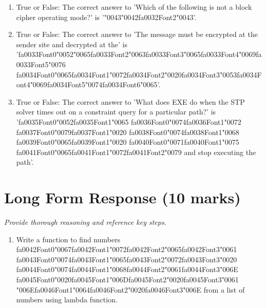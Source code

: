 \documentclass[12pt]{article}
\begin{document}
\begin{enumerate}[label=\arabic*.]
\item True or False: The correct answer to 'Which of the following is not a block cipher operating mode?' is '{\char"0043}{\char"0042}{\csname fa0032Font2\endcsname\char"0043}'.
\item True or False: The correct answer to 'The message must be encrypted at the sender site and decrypted at the' is '{\csname fa0033Font0\endcsname\char"0052}{\char"0065}{\csname fa0033Font2\endcsname\char"0063}{\csname fa0033Font3\endcsname\char"0065}{\csname fa0033Font4\endcsname\char"0069}{\csname fa0033Font5\endcsname\char"0076} {\csname fa0034Font0\endcsname\char"0065}{\csname fa0034Font1\endcsname\char"0072}{\csname fa0034Font2\endcsname\char"0020}{\csname fa0034Font3\endcsname\char"0053}{\csname fa0034Font4\endcsname\char"0069}{\csname fa0034Font5\endcsname\char"0074}{\csname fa0034Font6\endcsname\char"0065}'.
\item True or False: The correct answer to 'What does EXE do when the STP solver times out on a constraint query for a particular path?' is '{\csname fa0035Font0\endcsname\char"0052}{\csname fa0035Font1\endcsname\char"0065} {\csname fa0036Font0\endcsname\char"0074}{\csname fa0036Font1\endcsname\char"0072} {\csname fa0037Font0\endcsname\char"0079}{\csname fa0037Font1\endcsname\char"0020} {\csname fa0038Font0\endcsname\char"0074}{\csname fa0038Font1\endcsname\char"0068} {\csname fa0039Font0\endcsname\char"0065}{\csname fa0039Font1\endcsname\char"0020} {\csname fa0040Font0\endcsname\char"0071}{\csname fa0040Font1\endcsname\char"0075} {\csname fa0041Font0\endcsname\char"0065}{\csname fa0041Font1\endcsname\char"0072}{\csname fa0041Font2\endcsname\char"0079} and stop executing the path'.
\end{enumerate}

\section*{Long Form Response (10 marks)}
\textit{Provide thorough reasoning and reference key steps.}
\begin{enumerate}[label=\arabic*.]
\item Write a function to find numbers {\csname fa0042Font0\endcsname\char"0067}{\csname fa0042Font1\endcsname\char"0072}{\csname fa0042Font2\endcsname\char"0065}{\csname fa0042Font3\endcsname\char"0061} {\csname fa0043Font0\endcsname\char"0074}{\csname fa0043Font1\endcsname\char"0065}{\csname fa0043Font2\endcsname\char"0072}{\csname fa0043Font3\endcsname\char"0020} {\csname fa0044Font0\endcsname\char"0074}{\csname fa0044Font1\endcsname\char"0068}{\csname fa0044Font2\endcsname\char"0061}{\csname fa0044Font3\endcsname\char"006E} {\csname fa0045Font0\endcsname\char"0020}{\csname fa0045Font1\endcsname\char"006D}{\csname fa0045Font2\endcsname\char"0020}{\csname fa0045Font3\endcsname\char"0061} {\char"006E}{\csname fa0046Font1\endcsname\char"0064}{\csname fa0046Font2\endcsname\char"0020}{\csname fa0046Font3\endcsname\char"006E} from a list of numbers using lambda
function.
\end{enumerate}
\end{document}
